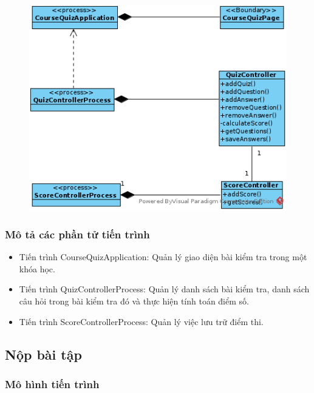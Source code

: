 \documentclass[./../main_file.tex]{subfiles}
\begin{document}
\begin{figure}[H]
	\centering
	\includegraphics[width=\linewidth]{./images/pv_take_test.png}
\end{figure}

\subsubsection{Mô tả các phần tử tiến trình}
\begin{itemize}
	\item Tiến trình CourseQuizApplication: Quản lý giao diện bài kiểm tra trong một khóa học.
	\item Tiến trình QuizControllerProcess: Quản lý danh sách bài kiểm tra, danh sách câu hỏi trong bài kiểm tra đó và thực hiện tính toán điểm số.
	\item Tiến trình ScoreControllerProcess: Quản lý việc lưu trữ điểm thi.
	
\end{itemize}

\subsection{Nộp bài tập}

\subsubsection{Mô hình tiến trình}
\end{document}
